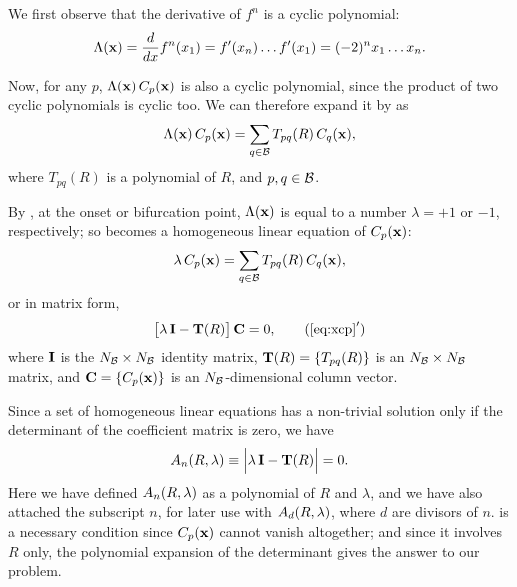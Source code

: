 \documentclass[preprint]{revtex4-1}
\begin{document}
We first observe that the derivative of $f^n$
is a cyclic polynomial:
%
\begin{equation}
  \Lambda(\mathbf{x})
   = \frac{d}{dx}f^{n}(x_1)
   = f'(x_n) \dots f'(x_1)
   = (-2)^n x_1 \dots x_n.
\label{eq:logder}
\end{equation}



Now, for any $p$, $\Lambda(\mathbf{x}) \, C_p(\mathbf{x})$
  is also a cyclic polynomial,
since the product of two cyclic polynomials is cyclic too.
We can therefore expand it by  as
\begin{equation}
  \Lambda(\mathbf{x}) \, C_p(\mathbf{x}) = \sum_{q \in \mathcal B} T_{pq}(R) \, C_q(\mathbf{x}),
\label{eq:xcp0}
\end{equation}
where $T_{pq}(R)$ is a polynomial of $R$,
and $p, q \in \mathcal B$.



By , at the onset or bifurcation point,
  $\Lambda(\mathbf{x})$ is equal to a number
  $\lambda = +1$ or $-1$, respectively;
  so 
  becomes a homogeneous linear equation of
  $C_p(\mathbf{x})$:
\begin{equation}
  \lambda \, C_p(\mathbf{x}) = \sum_{q \in \mathcal B} T_{pq}(R) \, C_q(\mathbf{x}),
\label{eq:xcp}
\end{equation}
%
%
or in matrix form,
\begin{equation}
  \big[ \lambda \, \vct I - \vct T(R) \big] \, \vct C = 0,
\tag{$\ref{eq:xcp}'$}
\end{equation}
%
%
where
$\mathbf{I}$ is the $N_\mathcal B \times N_\mathcal B$ identity matrix,
$\mathbf{T}(R) = \{T_{pq}(R)\}$ is an $N_\mathcal B \times N_\mathcal B$ matrix,
and
$\mathbf{C} = \{C_p(\mathbf{x})\}$ is an $N_\mathcal B$-dimensional column vector.




Since a set of homogeneous linear equations
  has a non-trivial solution
  only if the determinant of the coefficient matrix
  is zero, we have
\begin{equation}
  A_n(R, \lambda) \equiv \Big| \lambda \, \mathbf{I} - \mathbf{T}(R) \Big| = 0.
\label{eq:xr}
\end{equation}
Here we have defined $A_n(R, \lambda)$ as a polynomial of $R$ and $\lambda$,
  and we have also attached the subscript $n$,
  for later use with $A_d(R, \lambda)$, where $d$ are divisors of $n$.
 is a necessary condition
  since $C_p(\mathbf{x})$ cannot vanish altogether;
and since it involves $R$ only,
  the polynomial expansion of the determinant
  gives the answer to our problem.
\end{document}
